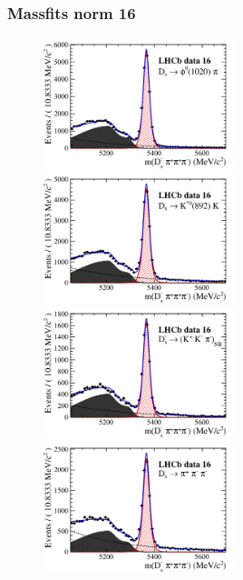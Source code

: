 \documentclass[]{beamer}
\begin{document}
\begin{frame}
\frametitle{Massfits norm 16}

\begin{figure}
\includegraphics[height=!,width=0.5\textwidth]{plots/norm_y16_phipi.pdf}
\includegraphics[height=!,width=0.5\textwidth]{plots/norm_y16_KsK.pdf}\\
\includegraphics[height=!,width=0.5\textwidth]{plots/norm_y16_KKpi_NR.pdf}
\includegraphics[height=!,width=0.5\textwidth]{plots/norm_y16_pipipi.pdf}
\end{figure}

\end{frame}
\end{document}
